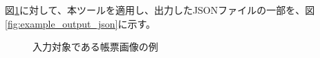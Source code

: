 図\ref{fig:original}に対して、本ツールを適用し、出力したJSONファイルの一部を、図\ref{fig:example_output_json}に示す。

\begin{figure}[t]
    \begin{center}
        \caption{入力対象である帳票画像の例}
        \label{fig:original}
    \end{center}
\end{figure}



